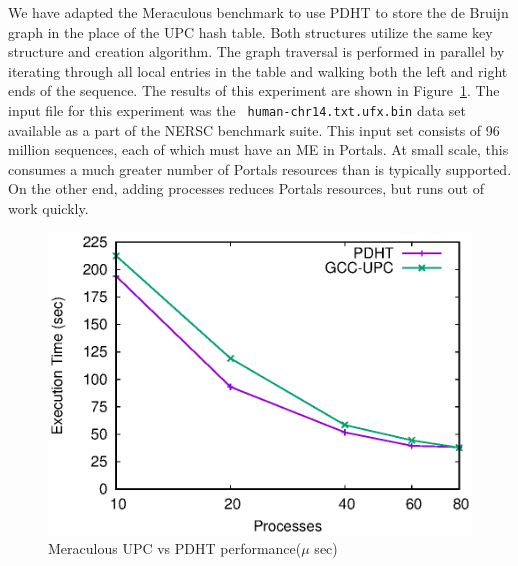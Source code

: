 We have adapted the Meraculous benchmark to use PDHT to store the de Bruijn
graph in the place of the UPC hash table. Both structures utilize the same key
structure and creation algorithm. The graph traversal is performed in parallel
by iterating through all local entries in the table and walking both the left
and right ends of the sequence. The results of this experiment are shown in
Figure~\ref{fig:meraculous}. The input file for this experiment was the {\tt
  human-chr14.txt.ufx.bin} data set available as a part of the NERSC benchmark
suite. This input set consists of 96 million sequences, each of which must have
an ME in Portals. At small scale, this consumes a much greater number of
Portals resources than is typically supported. On the other end, adding 
processes reduces Portals resources, but runs out of work quickly.

\begin{figure}[ht]
  \center
  \includegraphics[width=.9\linewidth]{plots/meraculous}
  \caption{Meraculous UPC vs PDHT performance($\mu$ sec)}
  \label{fig:meraculous}
\end{figure}


